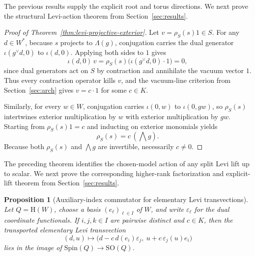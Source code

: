 \documentclass{birkjour}
\theoremstyle{plain}
\newtheorem{proposition}[theorem]{Proposition}
\theoremstyle{definition}
\theoremstyle{remark}
\numberwithin{equation}{section}
\newcommand{\Spin}{\mathrm{Spin}}
\newcommand{\SO}{\mathrm{SO}}
\newcommand{\Hyp}{\mathrm{H}}
\begin{document}
The previous results supply the explicit root and torus directions. We next
prove the structural Levi-action theorem from
Section~\ref{sec:results}.

\begin{proof}[Proof of Theorem~\ref{thm:levi-projective-exterior}]
Let $v=\rho_S(s)1\in S$. For any $d\in W^*$, because $s$ projects to
$\Lambda(g)$, conjugation carries the dual generator $\iota(g^{\vee}d,0)$ to
$\iota(d,0)$. Applying both sides to $1$ gives
\[
  \iota(d,0)\,v
  =
  \rho_S(s)\bigl(\iota(g^{\vee}d,0)\cdot 1\bigr)
  =0,
\]
since dual generators act on $S$ by contraction and annihilate the vacuum
vector $1$. Thus every contraction operator kills $v$, and the vacuum-line
criterion from Section~\ref{sec:arch} gives $v=c\cdot 1$ for some $c\in K$.

Similarly, for every $w\in W$, conjugation carries $\iota(0,w)$ to
$\iota(0,gw)$, so $\rho_S(s)$ intertwines exterior multiplication by $w$ with
exterior multiplication by $gw$. Starting from $\rho_S(s)1=c$ and inducting on
exterior monomials yields
\[
  \rho_S(s)=c\,(\bigwedge g).
\]
Because both $\rho_S(s)$ and $\bigwedge g$ are invertible, necessarily
$c\ne 0$.
\end{proof}

The preceding theorem identifies the chosen-model action of any split Levi lift
up to scalar. We next prove the corresponding higher-rank factorization and
explicit-lift theorem from Section~\ref{sec:results}.

\begin{proposition}[Auxiliary-index commutator for elementary Levi transvections]
\label{prop:auxiliary-index-commutator}
Let \(Q=\Hyp(W)\), choose a basis \((e_\ell)_{\ell\in I}\) of \(W\), and
write \(\varepsilon_\ell\) for the dual coordinate functionals. If \(i,j,k\in I\)
are pairwise distinct and \(c\in K\), then the transported elementary Levi
transvection
\[
  (d,u)\longmapsto
  \bigl(d-c\,d(e_i)\varepsilon_j,\ u+c\,\varepsilon_j(u)e_i\bigr)
\]
lies in the image of \(\Spin(Q)\to\SO(Q)\).
\end{proposition}
\end{document}
